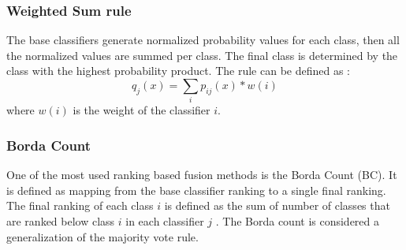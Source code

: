 \documentclass[conference]{IEEEtran}
\begin{document}
\subsubsection{Weighted Sum rule}
 The base classifiers generate normalized probability values for each class, then all the normalized values are summed per class. The final class is determined by the class with the highest probability product. The rule can be defined as :
\[
q_j(x)=\sum\limits_i{p_{ij}(x)*w(i)}
\]
where $w(i)$ is the weight of the classifier $i$.



\subsubsection{Borda Count}
 One of the most used ranking based fusion methods is the Borda Count (BC). It is defined as mapping from the base classifier ranking to a single final ranking. The final ranking of each class  $i$  is defined as the sum of number of classes that are ranked below class $i$  in each classifier $j$ . The Borda count is considered a generalization of the majority vote rule.
%
\end{document}
